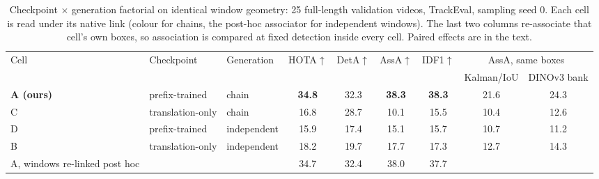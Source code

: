 \documentclass{article} %
\newcommand{\rev}[1]{#1}
\begin{document}
\begin{table}[t]
\caption{\rev{Checkpoint $\times$ generation factorial on identical window geometry: 25
full-length validation videos, TrackEval, sampling seed 0. Each cell is read under its
native link (colour for chains, the post-hoc associator for independent windows). The last
two columns re-associate that cell's own boxes, so association is compared at fixed
detection inside every cell. Paired effects are in the text.}}
\label{tab:ab}
\begin{center}
\scriptsize
\setlength{\tabcolsep}{3pt}
\begin{tabular}{lllcccccc}
\toprule
\rev{Cell} & \rev{Checkpoint} & \rev{Generation} & \rev{HOTA$\uparrow$} & \rev{DetA$\uparrow$} & \rev{AssA$\uparrow$} & \rev{IDF1$\uparrow$} & \multicolumn{2}{c}{\rev{AssA, same boxes}} \\
 & & & & & & & \rev{Kalman/IoU} & \rev{DINOv3 bank} \\
\midrule
\rev{\textbf{A (ours)}} & \rev{prefix-trained} & \rev{chain} & \rev{\textbf{34.8}} & \rev{32.3} & \rev{\textbf{38.3}} & \rev{\textbf{38.3}} & \rev{21.6} & \rev{24.3} \\
\rev{C} & \rev{translation-only} & \rev{chain} & \rev{16.8} & \rev{28.7} & \rev{10.1} & \rev{15.5} & \rev{10.4} & \rev{12.6} \\
\rev{D} & \rev{prefix-trained} & \rev{independent} & \rev{15.9} & \rev{17.4} & \rev{15.1} & \rev{15.7} & \rev{10.7} & \rev{11.2} \\
\rev{B} & \rev{translation-only} & \rev{independent} & \rev{18.2} & \rev{19.7} & \rev{17.7} & \rev{17.3} & \rev{12.7} & \rev{14.3} \\
\midrule
\rev{A, windows re-linked post hoc} & & & \rev{34.7} & \rev{32.4} & \rev{38.0} & \rev{37.7} & & \\
\bottomrule
\end{tabular}
\end{center}
\end{table}
\end{document}
